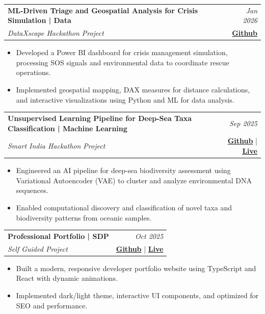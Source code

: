 \documentclass[a4paper,11pt]{article}
\makeatletter
\newcommand{\resumeItemListStart}{\begin{justify}\begin{itemize}[leftmargin=3ex, rightmargin=2ex, noitemsep,labelsep=1.2mm,itemsep=0.3mm]\small}
\newcommand{\resumeProject}[4]{
\vspace{1mm}\item
    \begin{tabular*}{0.98\textwidth}[t]{l@{\extracolsep{\fill}}r}
        \textbf{#1} & \textit{\footnotesize{#3}} \\
        \textit{\footnotesize{#2}} & \footnotesize{#4}
    \end{tabular*}
    \vspace{0mm}
}
\newcommand{\resumeItemListEnd}{\end{itemize}\end{justify}\vspace{-2mm}}
\makeatother
\begin{document}
     \vspace{10mm}
     
    \resumeProject
      {ML-Driven Triage and Geospatial Analysis for Crisis Simulation | Data} %
      {DataXscape Hackathon Project} %
      {Jan 2026} %
      {\href{https://github.com/Prasanna-Nadrajan/Island-Rescue-Mission}{\textbf{Github}}} %
      \resumeItemListStart
        \item {Developed a Power BI dashboard for crisis management simulation, processing SOS signals and environmental data to coordinate rescue operations.}
        \item {Implemented geospatial mapping, DAX measures for distance calculations, and interactive visualizations using Python and ML for data analysis.}
    \resumeItemListEnd
    
     \vspace{-1mm}
    \resumeProject
      {Unsupervised Learning Pipeline for Deep-Sea Taxa Classification | Machine Learning} %
      {Smart India Hackathon Project} %
      {Sep 2025} %
      {\href{https://github.com/Prasanna-Nadrajan/eDNA-VAI-Pipeline}{\textbf{Github}} | \href{https://edna-biodiversity-pipeline-production.up.railway.app/}{\textbf{Live}}} %
      \resumeItemListStart
        \item {Engineered an AI pipeline for deep-sea biodiversity assessment using Variational Autoencoder (VAE) to cluster and analyze environmental DNA sequences.}
        \item {Enabled computational discovery and classification of novel taxa and biodiversity patterns from oceanic samples.}
    \resumeItemListEnd
    \vspace{-1mm}
    \resumeProject
      {Professional Portfolio | SDP} %
      {Self Guided Project} %
      {Oct 2025} %
      {\href{https://github.com/Prasanna-Nadrajan/Portfolio-Prasaz}{\textbf{Github}} | \href{https://prasazx.tech/}{\textbf{Live}}}
      \resumeItemListStart
        \item {Built a modern, responsive developer portfolio website using TypeScript and React with dynamic animations.}
        \item {Implemented dark/light theme, interactive UI components, and optimized for SEO and performance.}
    \resumeItemListEnd
    
\end{document}
